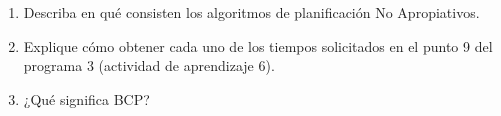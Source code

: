 \documentclass[12pt, a4paper]{article} %
\begin{document}
\begin{enumerate}
	\item Describa en qué consisten los algoritmos de planificación No Apropiativos.
	\item Explique cómo obtener cada uno de los tiempos solicitados en el punto 9 del programa 3 (actividad de aprendizaje 6).
	\item ¿Qué significa BCP? 
\end{enumerate}


\nocite{*} %

\clearpage


\end{document}
